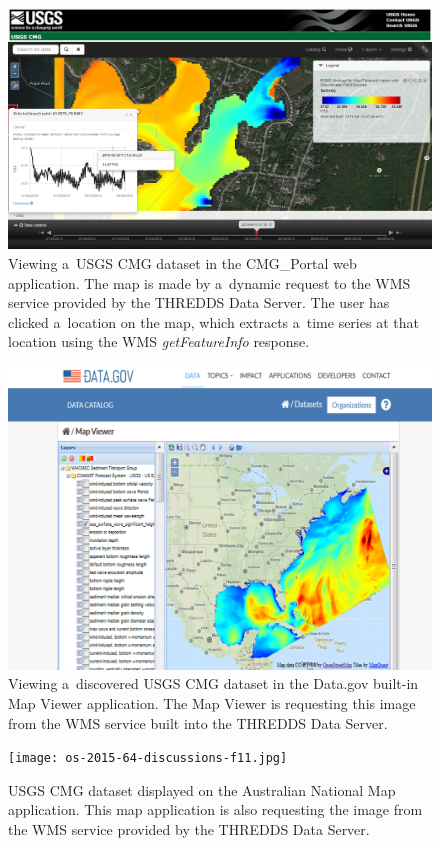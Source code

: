 \documentclass[osd, online, hvmath]{copernicus}
\begin{document}
\begin{figure}
\includegraphics[width=145mm]{os-2015-64-discussions-f09.png}
\caption{Viewing a~USGS CMG dataset in the CMG\_Portal web
  application. The map is made by a~dynamic request to the WMS service
  provided by the THREDDS Data Server. The user has clicked a~location
  on the map, which extracts a~time series at that location using the
  WMS \textit{getFeatureInfo} response. }
\label{osd-2015-0064-f09.pdf}
\end{figure}

\begin{figure}
\includegraphics[width=140mm]{os-2015-64-discussions-f10.png}
\caption{Viewing a~discovered USGS CMG dataset in the Data.gov
  built-in Map Viewer application. The Map Viewer is requesting this
  image from the WMS service built into the THREDDS Data Server. }
\label{osd-2015-0064-f10.pdf}
\end{figure}

\begin{figure}
\texttt{[image: os-2015-64-discussions-f11.jpg]}
\caption{USGS CMG dataset displayed on the Australian National Map
  application. This map application is also requesting the image from
  the WMS service provided by the THREDDS Data Server.}
\label{osd-2015-0064-f11.pdf}
\end{figure}
\end{document}

